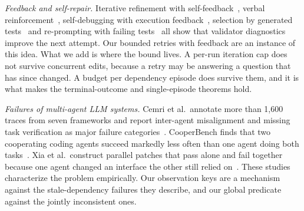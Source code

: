 \emph{Feedback and self-repair.} Iterative refinement with self-feedback~\cite{madaan2023selfrefine}, verbal reinforcement~\cite{shinn2023reflexion}, self-debugging with execution feedback~\cite{chen2024selfdebug}, selection by generated tests~\cite{chen2023codet} and re-prompting with failing tests~\cite{schafer2024testpilot} all show that validator diagnostics improve the next attempt. Our bounded retries with feedback are an instance of this idea. What we add is where the bound lives. A per-run iteration cap does not survive concurrent edits, because a retry may be answering a question that has since changed. A budget per dependency episode does survive them, and it is what makes the terminal-outcome and single-episode theorems hold.

\emph{Failures of multi-agent LLM systems.} Cemri et al.\ annotate more than 1,600 traces from seven frameworks and report inter-agent misalignment and missing task verification as major failure categories~\cite{cemri2025mast}. CooperBench finds that two cooperating coding agents succeed markedly less often than one agent doing both tasks~\cite{khatua2026cooperbench}. Xia et al.\ construct parallel patches that pass alone and fail together because one agent changed an interface the other still relied on~\cite{xia2026stale}. These studies characterize the problem empirically. Our observation keys are a mechanism against the stale-dependency failures they describe, and our global predicate against the jointly inconsistent ones.

